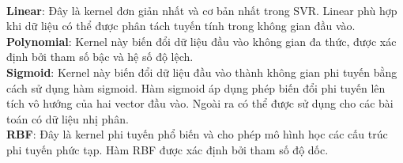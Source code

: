 \hfill\\
\textbf{Linear}: Đây là kernel đơn giản nhất và cơ bản nhất trong SVR. Linear phù hợp khi dữ liệu có thể được phân tách tuyến tính trong không gian đầu vào.\\
\textbf{Polynomial}: Kernel này biến đổi dữ liệu đầu vào không gian đa thức, được xác định bởi tham số bậc và hệ số độ lệch.\\
\textbf{Sigmoid}: Kernel này biến đổi dữ liệu đầu vào thành không gian phi tuyến bằng cách sử dụng hàm sigmoid. Hàm sigmoid áp dụng phép biến đổi phi tuyến lên tích vô hướng của hai vector đầu vào. Ngoài ra có thể được sử dụng cho các bài toán có dữ liệu nhị phân.\\
\textbf{RBF}: Đây là kernel phi tuyến phổ biến và cho phép mô hình học các cấu trúc phi tuyến phức tạp. Hàm RBF được xác định bởi tham số độ dốc.